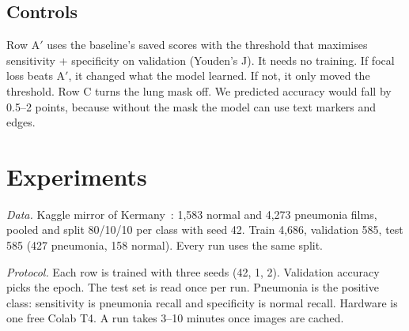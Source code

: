 \documentclass[conference]{IEEEtran}
\begin{document}
\subsection{Controls}
Row A$'$ uses the baseline's saved scores with the threshold that maximises sensitivity + specificity on validation (Youden's J). It needs no training. If focal loss beats A$'$, it changed what the model learned. If not, it only moved the threshold. Row C turns the lung mask off. We predicted accuracy would fall by 0.5--2 points, because without the mask the model can use text markers and edges.

\section{Experiments}
\textit{Data.} Kaggle mirror of Kermany~\cite{kermany2018}: 1{,}583 normal and 4{,}273 pneumonia films, pooled and split 80/10/10 per class with seed 42. Train 4{,}686, validation 585, test 585 (427 pneumonia, 158 normal). Every run uses the same split.

\textit{Protocol.} Each row is trained with three seeds (42, 1, 2). Validation accuracy picks the epoch. The test set is read once per run. Pneumonia is the positive class: sensitivity is pneumonia recall and specificity is normal recall. Hardware is one free Colab T4. A run takes 3--10 minutes once images are cached.

\begin{table}[t]
\caption{Test results, mean $\pm$ std over three seeds. FP and FN are mean counts out of 158 normal and 427 pneumonia films.}
\label{tab:ablation}
\centering
\footnotesize
\setlength{\tabcolsep}{3pt}
\end{table}
\end{document}
